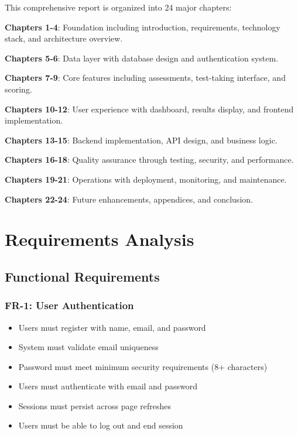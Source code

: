 \documentclass[12pt,a4paper]{report}
\begin{document}
This comprehensive report is organized into 24 major chapters:

\textbf{Chapters 1-4}: Foundation including introduction, requirements, technology stack, and architecture overview.

\textbf{Chapters 5-6}: Data layer with database design and authentication system.

\textbf{Chapters 7-9}: Core features including assessments, test-taking interface, and scoring.

\textbf{Chapters 10-12}: User experience with dashboard, results display, and frontend implementation.

\textbf{Chapters 13-15}: Backend implementation, API design, and business logic.

\textbf{Chapters 16-18}: Quality assurance through testing, security, and performance.

\textbf{Chapters 19-21}: Operations with deployment, monitoring, and maintenance.

\textbf{Chapters 22-24}: Future enhancements, appendices, and conclusion.

\chapter{Requirements Analysis}

\section{Functional Requirements}

\subsection{FR-1: User Authentication}

\begin{itemize}
    \item Users must register with name, email, and password
    \item System must validate email uniqueness
    \item Password must meet minimum security requirements (8+ characters)
    \item Users must authenticate with email and password
    \item Sessions must persist across page refreshes
    \item Users must be able to log out and end session
\end{itemize}
\end{document}
